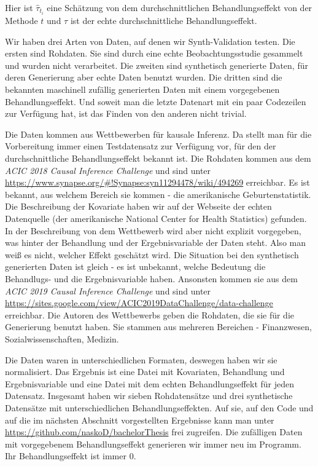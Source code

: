 \documentclass[12pt,a4paper,twoside]{scrartcl}
\numberwithin{equation}{section}
\begin{document}
\noindent
Hier ist $\hat{\tau}_{t_i}$ eine Schätzung von dem durchschnittlichen Behandlungseffekt von der Methode $t$ und $\tau$ ist der echte durchschnittliche Behandlungseffekt.\par

\noindent
Wir haben drei Arten von Daten, auf denen wir Synth-Validation testen. Die ersten sind Rohdaten. Sie sind durch eine echte Beobachtungsstudie gesammelt und wurden nicht verarbeitet. Die zweiten sind synthetisch generierte Daten, für deren Generierung aber echte Daten benutzt wurden. Die dritten sind die bekannten maschinell zufällig generierten Daten mit einem vorgegebenen Behandlungseffekt. Und soweit man die letzte Datenart mit ein paar Codezeilen zur Verfügung hat, ist das Finden von den anderen nicht trivial.\par 

\noindent
Die Daten kommen aus Wettbewerben für kausale Inferenz. Da stellt man für die Vorbereitung immer einen Testdatensatz zur Verfügung vor, für den der durchschnittliche Behandlungseffekt bekannt ist. Die Rohdaten kommen aus dem \emph{ACIC 2018 Causal Inference Challenge} und sind unter \url{https://www.synapse.org/#!Synapse:syn11294478/wiki/494269} erreichbar. Es ist bekannt, aus welchem Bereich sie kommen - die amerikanische Geburtenstatistik. Die Beschreibung der Kovariate haben wir auf der Webseite der echten Datenquelle (der amerikanische National Center for Health Statistics) gefunden. In der Beschreibung von dem Wettbewerb wird aber nicht explizit vorgegeben, was hinter der Behandlung und der Ergebnisvariable der Daten steht. Also man weiß es nicht, welcher Effekt geschätzt wird. Die Situation bei den synthetisch generierten Daten ist gleich - es ist unbekannt, welche Bedeutung die Behandlugs- und die Ergebnisvariable haben. Ansonsten kommen sie aus dem \emph{ACIC 2019 Causal Inference Challenge} und sind unter \url{https://sites.google.com/view/ACIC2019DataChallenge/data-challenge} erreichbar. Die Autoren des Wettbewerbs geben die Rohdaten, die sie für die Generierung benutzt haben. Sie stammen aus mehreren Bereichen - Finanzwesen, Sozialwissenschaften, Medizin.\par   

\noindent
Die Daten waren in unterschiedlichen Formaten, deswegen haben wir sie normalisiert. Das Ergebnis ist eine Datei mit Kovariaten, Behandlung und Ergebnisvariable und eine Datei mit dem echten Behandlungseffekt für jeden Datensatz. Insgesamt haben wir sieben Rohdatensätze und drei synthetische Datensätze mit unterschiedlichen Behandlungseffekten. Auf sie, auf den Code und auf die im nächsten Abschnitt vorgestellten Ergebnisse kann man unter \url{https://github.com/naskoD/bachelorThesis} frei zugreifen. Die zufälligen Daten mit vorgegebenem  Behandlungseffekt generieren wir immer neu im Programm. Ihr Behandlungseffekt ist immer 0.\par
\end{document}

